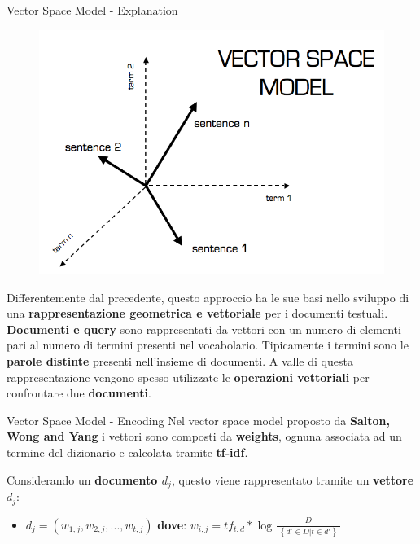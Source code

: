 \documentclass[british]{beamer}
\begin{document}
\begin{frame}{Vector Space Model - Explanation}
	\begin{figure}
		\includegraphics[width=1.1\linewidth,height=0.4\textwidth]{./Imgs/vector_space.png}
	\end{figure}	
	Differentemente dal precedente, questo approccio ha le sue basi nello sviluppo di una \textbf{rappresentazione geometrica e vettoriale} per i documenti testuali.
	\textbf{Documenti e query} sono rappresentati da vettori con un numero di elementi pari al numero di termini presenti nel vocabolario.
	Tipicamente i termini sono le \textbf{parole distinte} presenti nell'insieme di documenti.
	A valle di questa rappresentazione vengono spesso utilizzate le \textbf{operazioni vettoriali} per confrontare due \textbf{documenti}.
\end{frame}

\begin{frame}{Vector Space Model - Encoding}
	Nel vector space model proposto da \textbf{Salton, Wong and Yang} i vettori sono composti da \textbf{weights}, ognuna associata ad un termine del dizionario e calcolata tramite \textbf{tf-idf}.\par
	Considerando un \textbf{documento \(d_j\)}, questo viene rappresentato tramite un \textbf{vettore \(d_j\)}: \par
	\begin{itemize}
		\item \(d_j = (w_{1,j}, w_{2,j}, ..., w_{t,j})\) \textbf{dove}:
		\(w_{i,j} = tf_{t,d} * \log_{}{\frac{|D|}{|\left \{d' \in D | t \in d'\right \}|}}\)
	\end{itemize}
\end{frame}
\end{document}
